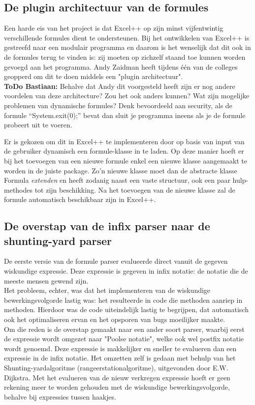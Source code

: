 \documentclass[a4paper,11pt]{article}
\begin{document}
\newpage\subsection{De plugin architectuur van de formules}
Een harde eis van het project is dat Excel++ op zijn minst vijfentwintig verschillende formules dient te ondersteunen. Bij het ontwikkelen van Excel++ is gestreefd naar een modulair programma en daarom is het wenselijk dat dit ook in de formules terug te vinden is: zij moeten op zichzelf staand toe kunnen worden gevoegd aan het programma. Andy Zaidman heeft tijdens één van de colleges geopperd om dit te doen middels een "plugin architectuur".\\

\textbf{ToDo Bastiaan:} Behalve dat Andy dit voorgesteld heeft zijn er nog andere voordelen van deze architecture? Zou het ook anders kunnen? Wat zijn mogelijke problemen van dynamische formules? Denk bevoordeeld aan security, als de formule “System.exit(0);” bevat dan sluit je programma ineens als je de formule probeert uit te voeren.

Er is gekozen om dit in Excel++ te implementeren door op basis van input van de gebruiker dynamisch een formule-klasse in te laden. Op deze manier hoeft er bij het toevoegen van een nieuwe formule enkel een nieuwe klasse aangemaakt te worden in de juiste package. Zo'n nieuwe klasse moet dan de abstracte klasse Formula \textit{extenden} en heeft zodanig naast een vaste structuur, ook een paar hulp-methodes tot zijn beschikking. Na het toevoegen van de nieuwe klasse zal de formule automatisch beschikbaar zijn in Excel++.\\

\subsection{De overstap van de infix parser naar de shunting-yard parser}
De eerste versie van de formule parser evalueerde direct vanuit de gegeven wiskundige expressie. Deze expressie is gegeven in infix notatie: de notatie die de meeste mensen gewend zijn.\\

Het probleem, echter, was dat het implementeren van de wiskundige bewerkingsvolgorde lastig was: het resulteerde in code die methoden aanriep in methoden. Hierdoor was de code uiteindelijk lastig te begrijpen, dat automatisch ook het optimaliseren ervan en het opsporen van bugs moeilijker maakte.\\ Om die reden is de overstap gemaakt naar een ander soort parser, waarbij eerst de expressie wordt omgezet naar "Poolse notatie", welke ook wel postfix notatie wordt genoemd. Deze expressie is makkelijker en sneller te evalueren dan een expressie in de infix notatie. Het omzetten zelf is gedaan met behulp van het Shunting-yardalgoritme (rangeerstationalgoritme), uitgevonden door E.W. Dijkstra. Met het evalueren van de nieuw verkregen expressie hoeft er geen rekening meer te worden gehouden met de wiskundige bewerkingsvolgorde, behalve bij expressies tussen haakjes.\\
\end{document}
